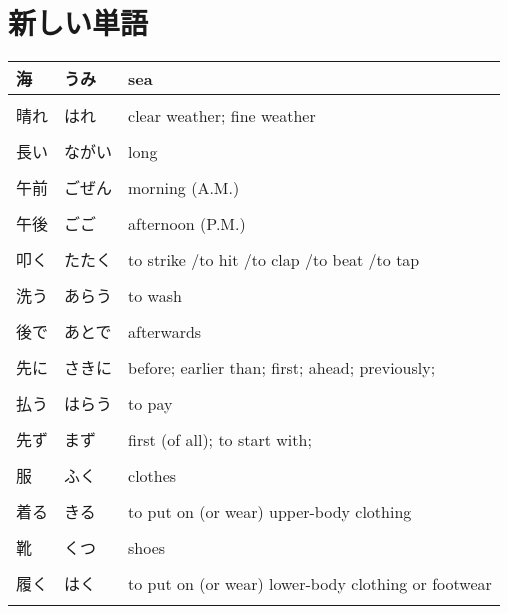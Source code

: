 \documentclass{article}
\begin{document}

\section{新しい単語}
\begin{tabular}{ l | p{4cm} p{12cm} }
海 & うみ & sea \\ \hline\\[-1em]
晴れ & はれ & clear weather; fine weather \\ \hline\\[-1em]
長い & ながい & long \\ \hline\\[-1em]
午前 & ごぜん & morning (A.M.) \\ \hline\\[-1em]
午後 & ごご & afternoon (P.M.) \\ \hline\\[-1em]
叩く & たたく & to strike /to hit /to clap /to beat /to tap \\ \hline\\[-1em]
洗う & あらう & to wash \\ \hline\\[-1em]
後で & あとで & afterwards \\ \hline\\[-1em]
先に & さきに & before; earlier than; first; ahead; previously; \\ \hline\\[-1em]
払う & はらう & to pay \\ \hline\\[-1em]
先ず & まず & first (of all); to start with; \\ \hline\\[-1em]
服 & ふく & clothes  \\ \hline\\[-1em]
着る & きる & to put on (or wear) upper-body clothing \\ \hline\\[-1em]
靴 & くつ & shoes \\ \hline\\[-1em]
履く & はく & to put on (or wear) lower-body clothing or footwear \\ \hline\\[-1em]

\end{tabular}
\end{document}

